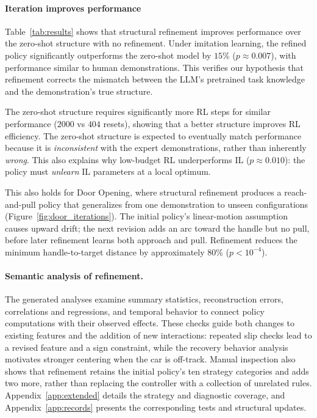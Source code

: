 \paragraph{Iteration improves performance}

Table~\ref{tab:results} shows that structural refinement improves performance over the zero-shot structure with no refinement.
Under imitation learning, the refined policy significantly outperforms the zero-shot model by $15\%$ ($p \approx 0.007$), with performance similar to human demonstrations.
This verifies our hypothesis that refinement corrects the mismatch between the LLM's pretrained task knowledge and the demonstration's true structure.

The zero-shot structure requires significantly more RL steps for similar performance ($2000$ vs $404$ resets), showing that a better structure improves RL efficiency.
The zero-shot structure is expected to eventually match performance because it is \textit{inconsistent} with the expert demonstrations, rather than inherently \textit{wrong}.
This also explains why low-budget RL underperforms IL ($p \approx 0.010$): the policy must \textit{unlearn} IL parameters at a local optimum.

This also holds for Door Opening, where structural refinement produces a reach-and-pull policy that generalizes from one demonstration to unseen configurations (Figure~\ref{fig:door_iterations}).
The initial policy's linear-motion assumption causes upward drift; the next revision adds an arc toward the handle but no pull, before later refinement learns both approach and pull.
Refinement reduces the minimum handle-to-target distance by approximately 80\% ($p<10^{-4}$).

\paragraph{Semantic analysis of refinement.}
\label{sec:edit-analysis}
The generated analyses examine summary statistics, reconstruction errors, correlations and regressions, and temporal behavior to connect policy computations with their observed effects.
These checks guide both changes to existing features and the addition of new interactions: repeated slip checks lead to a revised feature and a sign constraint, while the recovery behavior analysis motivates stronger centering when the car is off-track.
Manual inspection also shows that refinement retains the initial policy's ten strategy categories and adds two more, rather than replacing the controller with a collection of unrelated rules.
Appendix~\ref{app:extended} details the strategy and diagnostic coverage, and Appendix~\ref{app:records} presents the corresponding tests and structural updates.

